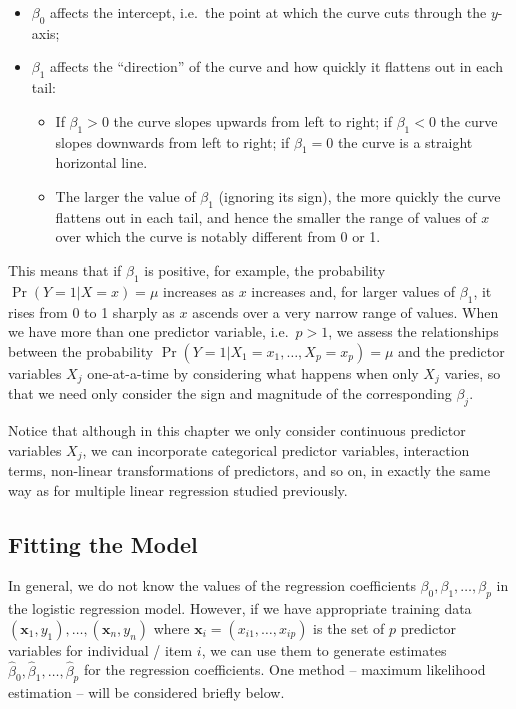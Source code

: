 \documentclass[
]{article}
\providecommand{\tightlist}{%
  \setlength{\itemsep}{0pt}\setlength{\parskip}{0pt}}
\begin{document}
\begin{itemize}
\tightlist
\item
  \(\beta_0\) affects the intercept, i.e.~the point at which the curve
  cuts through the \(y\)-axis;
\item
  \(\beta_1\) affects the ``direction'' of the curve and how quickly it
  flattens out in each tail:

  \begin{itemize}
  \tightlist
  \item
    If \(\beta_1 > 0\) the curve slopes upwards from left to right; if
    \(\beta_1 < 0\) the curve slopes downwards from left to right; if
    \(\beta_1=0\) the curve is a straight horizontal line.
  \item
    The larger the value of \(\beta_1\) (ignoring its sign), the more
    quickly the curve flattens out in each tail, and hence the smaller
    the range of values of \(x\) over which the curve is notably
    different from 0 or 1.
  \end{itemize}
\end{itemize}

This means that if \(\beta_1\) is positive, for example, the probability
\(\Pr(Y = 1 | X = x) = \mu\) increases as \(x\) increases and, for
larger values of \(\beta_1\), it rises from 0 to 1 sharply as \(x\)
ascends over a very narrow range of values. When we have more than one
predictor variable, i.e.~\(p > 1\), we assess the relationships between
the probability \(\Pr(Y = 1 | X_1=x_1, \ldots, X_p=x_p) = \mu\) and the
predictor variables \(X_j\) one-at-a-time by considering what happens
when only \(X_j\) varies, so that we need only consider the sign and
magnitude of the corresponding \(\beta_j\).

Notice that although in this chapter we only consider continuous
predictor variables \(X_j\), we can incorporate categorical predictor
variables, interaction terms, non-linear transformations of predictors,
and so on, in exactly the same way as for multiple linear regression
studied previously.

\hypertarget{fitting-the-model}{%
\subsection{Fitting the Model}\label{fitting-the-model}}

In general, we do not know the values of the regression coefficients
\(\beta_0,\beta_1,\ldots,\beta_p\) in the logistic regression model.
However, if we have appropriate training data
\((\boldsymbol{x}_1, y_1),\ldots,(\boldsymbol{x}_n, y_n)\) where
\(\boldsymbol{x}_i = (x_{i1}, \ldots, x_{ip})\) is the set of \(p\)
predictor variables for individual / item \(i\), we can use them to
generate estimates
\(\hat{\beta}_0, \hat{\beta}_1, \ldots, \hat{\beta}_p\) for the
regression coefficients. One method -- maximum likelihood estimation --
will be considered briefly below.
\end{document}
